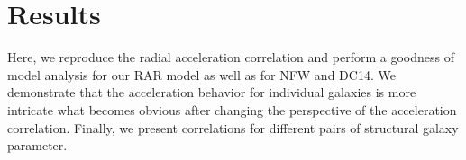 \section{Results}
\label{sec:results}
Here, we reproduce the radial acceleration correlation and perform a goodness of model analysis for our RAR model as well as for NFW and DC14. We demonstrate that the acceleration behavior for individual galaxies is more intricate what becomes obvious after changing the perspective of the acceleration correlation. Finally, we present correlations for different pairs of structural galaxy parameter.





